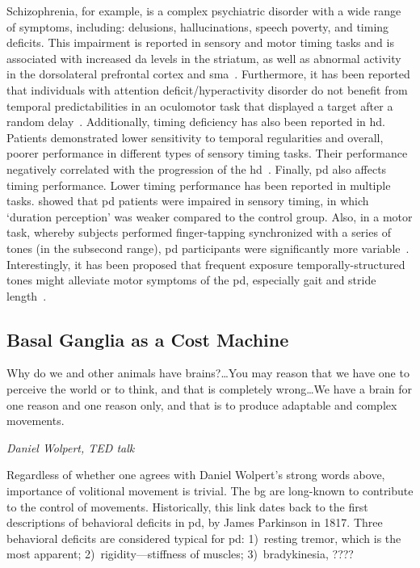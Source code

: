 Schizophrenia, for example, is a complex psychiatric disorder with a wide range of symptoms, including: delusions, hallucinations, speech poverty, and timing deficits.
This impairment is reported in sensory and motor timing tasks and is associated with increased \gls{da} levels in the striatum, as well as abnormal activity in the dorsolateral prefrontal cortex and \gls{sma}~\cite[see][]{Snowden2019}.
Furthermore, it has been reported that individuals with attention deficit/hyperactivity disorder do not benefit from temporal predictabilities in an oculomotor task that displayed a target after a random delay~\cite{Dankner2017}.
Additionally, timing deficiency has also been reported in \gls{hd}.
Patients demonstrated lower sensitivity to temporal regularities and overall, poorer performance in different types of sensory timing tasks.
Their performance negatively correlated with the progression of the \gls{hd}~\cite{Cope2014}.
Finally, \gls{pd} also affects timing performance.
Lower timing performance has been reported in multiple tasks.
 showed that \gls{pd} patients were impaired in sensory timing, in which `duration perception' was weaker compared to the control group.
Also, in a motor task, whereby subjects performed finger-tapping synchronized with a series of tones (in the subsecond range), \gls{pd} participants were significantly more variable~\cite{Harrington1998}.
Interestingly, it has been proposed that frequent exposure temporally-structured tones might alleviate motor symptoms of the \gls{pd}, especially gait and stride length~\cite{Dalla2017}.

\subsection{Basal Ganglia as a Cost Machine}
\label{intro:BGMotor}
\epigraph{Why do we and other animals have brains?\dots You may reason that we have one to perceive the world or to think, and that is completely wrong\dots We have a brain for one reason and one reason only, and that is to produce adaptable and complex movements.}
{\textit{Daniel Wolpert, TED talk}}
\noindent

Regardless of whether one agrees with Daniel Wolpert's strong words above, importance of volitional movement is trivial.
The \gls{bg} are long-known to contribute to the control of movements.
Historically, this link dates back to the first descriptions of behavioral deficits in \gls{pd}, by James Parkinson in 1817.
Three behavioral deficits are considered typical for \gls{pd}:
    1)~resting tremor, which is the most apparent;
    2)~rigidity---stiffness of muscles;
    3)~bradykinesia, ????
